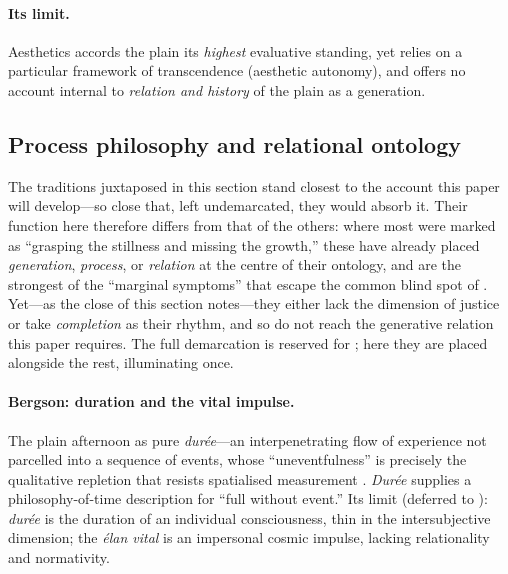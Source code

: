 \paragraph{Its limit.} Aesthetics accords the plain its \emph{highest} evaluative standing, yet relies on a particular framework of transcendence (aesthetic autonomy), and offers no account internal to \emph{relation and history} of the plain as a generation.

\subsection{Process philosophy and relational ontology}
\label{p19:sub:theories-process}

The traditions juxtaposed in this section stand closest to the account this paper will develop---so close that, left undemarcated, they would absorb it. Their function here therefore differs from that of the others: where most were marked as ``grasping the stillness and missing the growth,'' these have already placed \emph{generation}, \emph{process}, or \emph{relation} at the centre of their ontology, and are the strongest of the ``marginal symptoms'' that escape the common blind spot of . Yet---as the close of this section notes---they either lack the dimension of justice or take \emph{completion} as their rhythm, and so do not reach the generative relation this paper requires. The full demarcation is reserved for ; here they are placed alongside the rest, illuminating once.

\paragraph{Bergson: duration and the vital impulse.} The plain afternoon as pure \emph{durée}---an interpenetrating flow of experience not parcelled into a sequence of events, whose ``uneventfulness'' is precisely the qualitative repletion that resists spatialised measurement \parencite{bergson1910}. \emph{Durée} supplies a philosophy-of-time description for ``full without event.'' Its limit (deferred to ): \emph{durée} is the duration of an individual consciousness, thin in the intersubjective dimension; the \emph{élan vital} is an impersonal cosmic impulse, lacking relationality and normativity.

